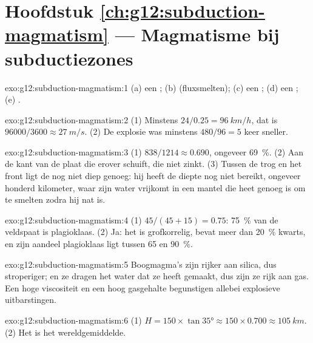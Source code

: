 \section*{Hoofdstuk \ref{ch:g12:subduction-magmatism} --- Magmatisme bij subductiezones}

\begin{solution}{exo:g12:subduction-magmatism:1}
(a) een ; (b)  (fluxsmelten); (c) een ;
(d) een ; (e) .
\end{solution}

\begin{solution}{exo:g12:subduction-magmatism:2}
(1) Minstens $24/0.25 = \qty{96}{km/h}$, dat is $\num{96000}/3600 \approx
\qty{27}{m/s}$. (2) De explosie was minstens $480/96 = 5$ keer sneller.
\end{solution}

\begin{solution}{exo:g12:subduction-magmatism:3}
(1) $838/1214 \approx 0.690$, ongeveer \qty{69}{\percent}. (2) Aan de kant van
de plaat die erover schuift, die niet zinkt. (3) Tussen de trog
en het front ligt de  nog niet diep genoeg: hij heeft de diepte nog niet bereikt,
ongeveer honderd kilometer, waar zijn water vrijkomt in een mantel die heet
genoeg is om te smelten zodra hij nat is.
\end{solution}

\begin{solution}{exo:g12:subduction-magmatism:4}
(1) $45/(45 + 15) = 0.75$: \qty{75}{\percent} van de veldspaat is
plagioklaas. (2) Ja: het is grofkorrelig, bevat meer dan
\qty{20}{\percent} kwarts, en zijn aandeel plagioklaas ligt tussen 65 en
\qty{90}{\percent}.
\end{solution}

\begin{solution}{exo:g12:subduction-magmatism:5}
Boogmagma's zijn rijker aan silica, dus stroperiger; en ze dragen
het water dat ze heeft gemaakt, dus zijn ze rijk aan gas. Een hoge viscositeit en een
hoog gasgehalte begunstigen allebei explosieve uitbarstingen.
\end{solution}

\begin{solution}{exo:g12:subduction-magmatism:6}
(1) $H = 150 \times \tan\ang{35} \approx 150 \times 0.700 \approx
\qty{105}{km}$. (2) Het is het wereldgemiddelde.
\end{solution}

